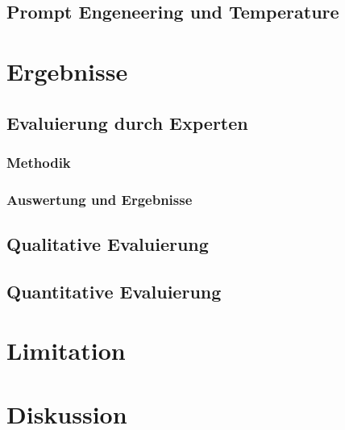 \documentclass[12pt,letterpaper,ngerman]{article}
\begin{document}
\subsection{Prompt Engeneering und Temperature}
\section{Ergebnisse}
\subsection{Evaluierung durch Experten}
\subsubsection{Methodik}
\subsubsection{Auswertung und Ergebnisse}
\subsection{Qualitative Evaluierung} 
\subsection{Quantitative Evaluierung} 
\section{Limitation}
\section{Diskussion}
\end{document}
